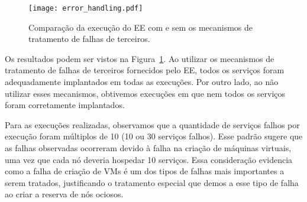 \begin{figure}[h]
  \centering
  \texttt{[image: error\_handling.pdf]}
  \caption{Comparação da execução do EE com e sem os mecanismos de tratamento de falhas de terceiros.}
  \label{fig:error_handling}
\end{figure}

Os resultados podem ser vistos na Figura~\ref{fig:error_handling}.
Ao utilizar os mecanismos de tratamento de falhas de terceiros fornecidos pelo EE,
todos os serviços foram adequadamente implantados em todas as execuções.
Por outro lado, ao não utilizar esses mecanismos, obtivemos execuções em que nem todos
os serviços foram corretamente implantados.

Para as execuções realizadas, observamos que
a quantidade de serviços falhos por execução foram múltiplos de 10
(10 ou 30 serviços falhos).
Esse padrão sugere que as falhas observadas
ocorreram devido à falha na criação de máquinas virtuais,
uma vez que cada nó deveria hospedar 10 serviços.
Essa consideração evidencia como a falha de criação de VMs é um
dos tipos de falhas mais importantes a serem tratados,
justificando o tratamento especial que demos a esse tipo de falha
ao criar a reserva de nós ociosos.










